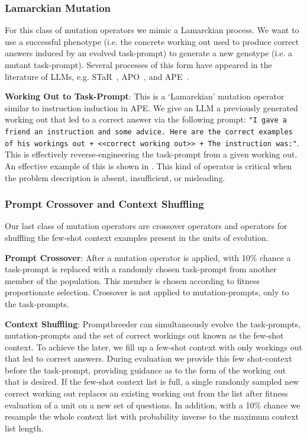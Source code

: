 \documentclass{article} %
\newcommand{\prompt}[1]{\footnotesize{\texttt{"#1"}}\normalsize}
\begin{document}
\subsubsection{Lamarckian Mutation} 
For this class of mutation operators we mimic a Lamarckian process. We want to use a successful phenotype (i.e. the concrete working out used to produce correct answers induced by an evolved task-prompt) to generate a new genotype (i.e. a mutant task-prompt). Several processes of this form have appeared in the literature of LLMs, e.g. STaR~\citep{DBLP:conf/nips/ZelikmanWMG22}, APO~\citep{pryzant2023automatic}, and APE~\citep{zhou2022large}.  

\textbf{Working Out to Task-Prompt}: This is a `Lamarckian' mutation operator similar to instruction induction in APE. We give an LLM a previously generated working out that led to a correct answer via the following prompt: \prompt{I gave a friend an instruction and some advice. Here are the correct examples of his workings out + <<correct working out>> + The instruction was:}. This is effectively reverse-engineering the task-prompt from a given working out. An effective example of this is shown in . This kind of operator is critical when the problem description is absent, insufficient, or misleading.

\subsubsection{Prompt Crossover and Context Shuffling}
Our last class of mutation operators are crossover operators and operators for shuffling the few-shot context examples present in the units of evolution. 

\textbf{Prompt Crossover}: After a mutation operator is applied, with 10\% chance a task-prompt is replaced with a randomly chosen task-prompt from another member of the population. This member is chosen according to fitness proportionate selection. Crossover is not applied to mutation-prompts, only to the task-prompts.

\textbf{Context Shuffling}: Promptbreeder can simultaneously evolve the task-prompts, mutation-prompts and the set of correct workings out known as the few-shot context. To achieve the later, we fill up a few-shot context with only workings out that led to correct answers. During evaluation we provide this few shot-context before the task-prompt, providing guidance as to the form of the working out that is desired. If the few-shot context list is full, a single randomly sampled new correct working out replaces an existing working out from the list after fitness evaluation of a unit on a new set of questions. In addition, with a 10\% chance we resample the whole context list with probability inverse to the maximum context list length. 
\end{document}

